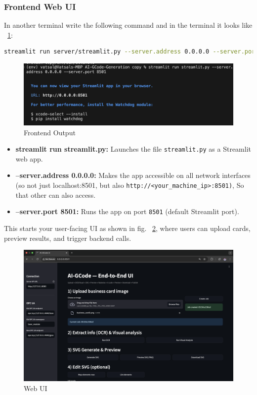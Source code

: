 \subsubsection{Frontend Web UI}
In another terminal write the following command and in the terminal it looks like ~\ref{streamlit}:
\begin{lstlisting}[language=bash,caption={Start Frontend Web UI}, label={lst:Frontend}]
	streamlit run server/streamlit.py --server.address 0.0.0.0 --server.port 8501
\end{lstlisting}


\begin{figure}
	\begin{center}
		\includegraphics[width=1\linewidth]{Images/streamlit.png}
		\caption{Frontend Output}
		\label{streamlit} 
	\end{center}
\end{figure}

\begin{itemize}
	\item \textbf{streamlit run streamlit.py:} Launches the file \texttt{streamlit.py} as a Streamlit web app.
	\item \textbf{--server.address 0.0.0.0:} Makes the app accessible on all network interfaces (so not just localhost:8501, but also \texttt{http://<your\_machine\_ip>:8501)}, So that other can also access.
	\item \textbf{--server.port 8501:} Runs the app on port \texttt{8501} (default Streamlit port).
\end{itemize}
This starts your user-facing UI as shown in fig. ~\ref{WebUI}, where users can upload cards, preview results, and trigger backend calls.

\begin{figure}
	\begin{center}
		\includegraphics[width=0.9\linewidth]{Images/WebUI.png}
		\caption{Web UI}
		\label{WebUI} 
	\end{center}
\end{figure}

